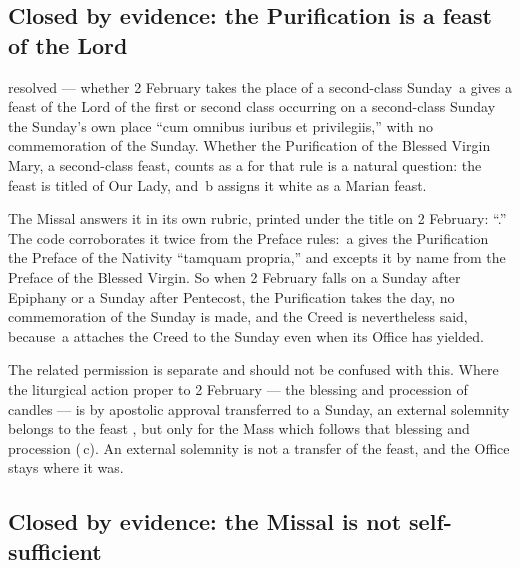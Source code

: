 \subsection{Closed by evidence: the Purification is a feast of the Lord}

\begin{contested}{resolved --- whether 2 February takes the place of a
second-class Sunday}
\,a gives a feast of the Lord of the first or second class occurring on
a second-class Sunday the Sunday's own place ``cum omnibus iuribus et
privilegiis,'' with no commemoration of the Sunday. Whether the Purification of
the Blessed Virgin Mary, a second-class feast, counts as a  for that rule is a natural question: the feast is titled of Our Lady,
and \,b assigns it white as a Marian feast.

The Missal answers it in its own rubric, printed under the title on 2 February:
``.'' The code corroborates it twice from the Preface rules: \,a
gives the Purification the Preface of the Nativity ``tamquam propria,'' and
 excepts it by name from the Preface of the Blessed Virgin. So when 2
February falls on a Sunday after Epiphany or a Sunday after Pentecost, the
Purification takes the day, no commemoration of the Sunday is made, and the
Creed is nevertheless said, because \,a attaches the Creed to the
Sunday even when its Office has yielded.

The related permission is separate and should not be confused with this. Where
the liturgical action proper to 2 February --- the blessing and procession of
candles --- is by apostolic approval transferred to a Sunday, an external
solemnity belongs to the feast , but only for the Mass which
follows that blessing and procession (\,c). An external solemnity is
not a transfer of the feast, and the Office stays where it was.
\end{contested}

\subsection{Closed by evidence: the Missal is not self-sufficient}

